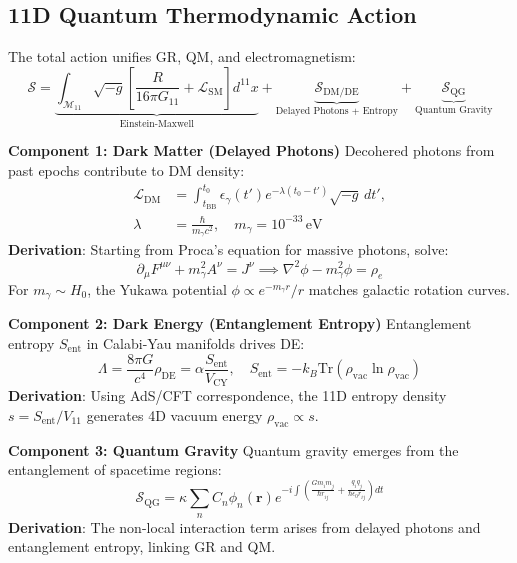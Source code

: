 \documentclass[12pt, a4paper]{article}
\begin{document}
\subsection{11D Quantum Thermodynamic Action}
\label{subsec:action}
The total action unifies GR, QM, and electromagnetism:
\begin{equation}
\mathcal{S} = \underbrace{\int_{\mathcal{M}_{11}} \sqrt{-g} \left[ \frac{R}{16\pi G_{11}} + \mathcal{L}_{\text{SM}} \right] d^{11}x}_{\text{Einstein-Maxwell}} + \underbrace{\mathcal{S}_{\text{DM/DE}}}_{\text{Delayed Photons + Entropy}} + \underbrace{\mathcal{S}_{\text{QG}}}_{\text{Quantum Gravity}}
\label{eq:total_action}
\end{equation}

\textbf{Component 1: Dark Matter (Delayed Photons)}
Decohered photons from past epochs contribute to DM density:
\begin{align}
\mathcal{L}_{\text{DM}} &= \int_{t_{\text{BB}}}^{t_0} \epsilon_\gamma(t') e^{-\lambda(t_0 - t')} \sqrt{-g} \, dt', \\
\lambda &= \frac{\hbar}{m_\gamma c^2}, \quad m_\gamma = 10^{-33} \, \text{eV}
\label{eq:dm_lagrangian}
\end{align}
\textbf{Derivation}: Starting from Proca's equation for massive photons, solve:
\begin{equation}
\partial_\mu F^{\mu\nu} + m_\gamma^2 A^\nu = J^\nu \implies \nabla^2 \phi - m_\gamma^2 \phi = \rho_e
\label{eq:proca}
\end{equation}
For \( m_\gamma \sim H_0 \), the Yukawa potential \( \phi \propto e^{-m_\gamma r}/r \) matches galactic rotation curves.

\textbf{Component 2: Dark Energy (Entanglement Entropy)}
Entanglement entropy \( S_{\text{ent}} \) in Calabi-Yau manifolds drives DE:
\begin{equation}
\Lambda = \frac{8\pi G}{c^4} \rho_{\text{DE}} = \alpha \frac{S_{\text{ent}}}{V_{\text{CY}}}, \quad S_{\text{ent}} = -k_B \text{Tr}(\rho_{\text{vac}} \ln \rho_{\text{vac}})
\label{eq:de}
\end{equation}
\textbf{Derivation}: Using AdS/CFT correspondence, the 11D entropy density \( s = S_{\text{ent}}/V_{11} \) generates 4D vacuum energy \( \rho_{\text{vac}} \propto s \).

\textbf{Component 3: Quantum Gravity}
Quantum gravity emerges from the entanglement of spacetime regions:
\begin{equation}
\mathcal{S}_{\text{QG}} = \kappa \sum_{n} C_n \phi_n(\bm{r}) e^{-i \int \left( \frac{G m_i m_j}{\hbar r_{ij}} + \frac{q_i q_j}{\hbar \epsilon_0 r_{ij}} \right) dt}
\label{eq:quantum_gravity}
\end{equation}
\textbf{Derivation}: The non-local interaction term arises from delayed photons and entanglement entropy, linking GR and QM.
\end{document}
